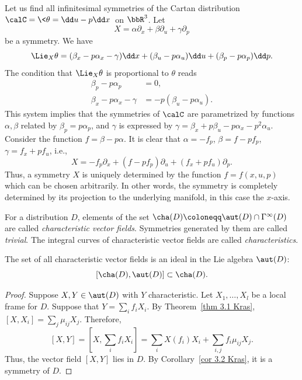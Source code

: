 \begin{example}\label{ex 3.4 Kras}
    Let us find all infinitesimal symmetries of the Cartan distribution $\calC=\<\theta=\dd u-p\dd x\>$ on $\bbR^3$. Let 
    \[X=\alpha\partial_x+\beta\partial_u+\gamma\partial_p\]
    be a symmetry. We have 
    \[\Lie_X\theta=(\beta_x-p\alpha_x-\gamma)\dd x+(\beta_u-p\alpha_u)\dd u+(\beta_p-p\alpha_p)\dd p.\]
    The condition that $\Lie_X\theta$ is proportional to $\theta$ reads 
    \begin{align}
        \beta_p-p\alpha_p&=0,\\
        \beta_x-p\alpha_x-\gamma&=-p(\beta_u-p\alpha_u).
    \end{align}
    This system implies that the symmetries of $\calC$ are parametrized by functions $\alpha,\beta$ related by $\beta_p=p\alpha_p$, and $\gamma$ is expressed by $\gamma=\beta_x+p\beta_u-p\alpha_x-p^2\alpha_u$. Consider the function $f=\beta-p\alpha$. It is clear that $\alpha=-f_p$, $\beta=f-pf_p$, $\gamma=f_x+pf_u$, i.e., 
    \[X=-f_p\partial_x+(f-pf_p)\partial_u+(f_x+pf_u)\partial_p.\label{eq ex 3.4 Kras}\]
    Thus, a symmetry $X$ is uniquely determined by the function $f=f(x,u,p)$ which can be chosen arbitrarily. In other words, the symmetry is completely determined by its projection to the underlying manifold, in this case the $x$-axis.
\end{example}

\begin{defn}[Characteristics]
    For a distribution $D$, elements of the set $\cha(D)\coloneqq \aut(D)\cap \Gamma^\infty(D)$ are called \emph{characteristic vector fields}. Symmetries generated by them are called \emph{trivial}. The integral curves of characteristic vector fields are called \emph{characteristics}.
\end{defn}

\begin{prop}\label{prop 3.3 Kras}
    The set of all characteristic vector fields is an ideal in the Lie algebra $\aut(D)$: 
    \[[\cha(D),\aut(D)]\subset \cha(D).\]
\end{prop}
\begin{proof}
    Suppose $X,Y\in \aut(D)$ with $Y$ characteristic. Let $X_1,\ldots,X_l$ be a local frame for $D$. Suppose that $Y=\sum_i f_i X_i$. By Theorem~\ref{thm 3.1 Kras}, $[X,X_i]=\sum_j\mu_{ij}X_j$. Therefore, 
    \[[X,Y]=\left[X,\sum_i f_i X_i\right]=\sum_i X(f_i)X_i+\sum_{i,j}f_i\mu_{ij}X_j.\]
    Thus, the vector field $[X,Y]$ lies in $D$. By Corollary~\ref{cor 3.2 Kras}, it is a symmetry of $D$.
\end{proof}

